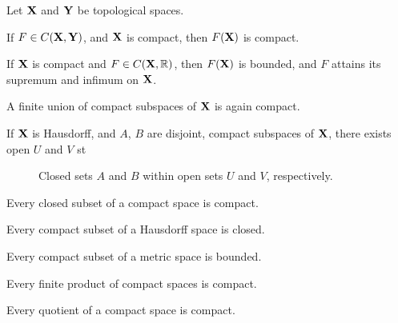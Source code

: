 \documentclass[../../main.tex]{subfiles}
\begin{document}
\providecommand{\szz}{\mathcal{S}}
\providecommand{\ccinf}{C_c^\infty}

\providecommand{\Taux}{\Tau_\xx}
\providecommand{\Tauy}{\Tau_\yy}
\providecommand{\Tauxy}{\Tau_{\xx\times\yy}}

\providecommand{\Bx}{\borel_\xx}
\providecommand{\By}{\borel_\yy}
\providecommand{\Bxy}{\borel_{\xx\times\yy}}


\begin{wts}\label{lee-appendix-A.45}
Let ${\mathbf{X}}$ and ${\mathbf{Y}}$ be topological spaces.
\begin{enumalpha}
    \item If $F\in C({\mathbf{X}},{\mathbf{Y}})$, and ${\mathbf{X}}$ is compact, then $F({\mathbf{X}})$ is compact.
    \item If ${\mathbf{X}}$ is compact and $F\in C({\mathbf{X}},\mathbb{R})$, then $F({\mathbf{X}})$ is bounded, and $F$ attains its supremum and infimum on ${\mathbf{X}}$.
    \item A finite union of compact subspaces of ${\mathbf{X}}$ is again compact.
    \item If ${\mathbf{X}}$ is Hausdorff, and $A$, $B$ are disjoint, compact subspaces of ${\mathbf{X}}$, there exists open $U$ and $V$ st
    \begin{figure}[htbp]
        \centering
        \caption{Closed sets $A$ and $B$ within open sets $U$ and $V$, respectively.}
        \label{lee-appendix-A.45-graphic}
    \end{figure}
    \item Every closed subset of a compact space is compact.
    \item Every compact subset of a Hausdorff space is closed.
    \item Every compact subset of a metric space is bounded.
    \item Every finite product of compact spaces is compact.
    \item Every quotient of a compact space is compact.
\end{enumalpha}
\end{wts}
\end{document}
